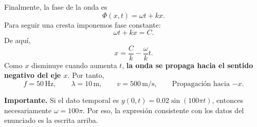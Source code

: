 \documentclass[11pt]{article}
\newcommand{\importante}[1]{%
  \par\medskip
  \noindent\textbf{Importante.} #1\par
}
\begin{document}
Finalmente, la fase de la onda es
\begin{equation*}
    \Phi(x,t)=\omega t+kx.
\end{equation*}
Para seguir una cresta imponemos fase constante:
\begin{equation*}
    \omega t+kx=C.
\end{equation*}
De aqu\'i,
\begin{equation*}
    x=\frac{C}{k}-\frac{\omega}{k}t.
\end{equation*}
Como $x$ disminuye cuando aumenta $t$, \textbf{la onda se propaga hacia el sentido negativo del eje $x$}. Por tanto,
\begin{equation*}
    \boxed{f=50\,\mathrm{Hz}},\qquad
    \boxed{\lambda=10\,\mathrm{m}},\qquad
    \boxed{v=500\,\mathrm{m/s}},\qquad
    \boxed{\text{Propagaci\'on hacia }{-x}}.
\end{equation*}

\importante{Si el dato temporal es $y(0,t)=0.02\sin(100\pi t)$, entonces necesariamente $\omega=100\pi$. Por eso, la expresi\'on consistente con los datos del enunciado es la escrita arriba.}
\end{document}
